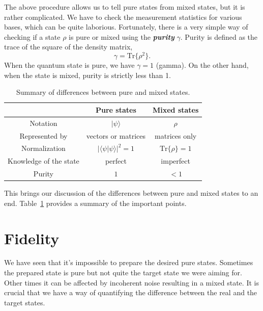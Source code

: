 The above procedure allows us to tell pure states from mixed states, but it is rather complicated.
We have to check the measurement statistics for various bases, which can be quite laborious.
Fortunately, there is a very simple way of checking if a state $\rho$ is pure or mixed using the \textit{\textbf{purity}} $\gamma$.
Purity is defined as the trace of the square of the density matrix,
\begin{equation}
    \gamma = \text{Tr} \{ \rho^2 \}.
\end{equation}
When the quantum state is pure, we have $\gamma=1$ (gamma).
On the other hand, when the state is mixed, purity is strictly less than 1.

\begin{table}[t]
    \centering
    \begin{tabular}{c|c|c}
         & Pure states & Mixed states \\
         \hline
        Notation & $|\psi\rangle$ & $\rho$ \\
        Represented by & vectors or matrices & matrices only \\
        Normalization & $|\langle\psi|\psi\rangle|^2=1$ & $\text{Tr}\{\rho\}=1$ \\
        Knowledge of the state & perfect & imperfect \\
        Purity & $1$ & $<1$ \\
    \end{tabular}
    \caption[Pure versus mixed states]{Summary of differences between pure and mixed states.}
    \label{tab:3-4_pure_vs_mixed}
\end{table}

This brings our discussion of the differences between pure and mixed states to an end.
Table~\ref{tab:3-4_pure_vs_mixed} provides a summary of the important points.




\section{Fidelity}
\label{sec:3-5_fidelity}

We have seen that it's impossible to prepare the desired pure states.
Sometimes the prepared state is pure but not quite the target state we were aiming for.
Other times it can be affected by incoherent noise resulting in a mixed state.
It is crucial that we have a way of quantifying the difference between the real and the target states.

